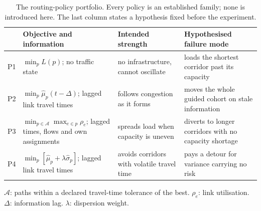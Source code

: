 \begin{table}[tbp]
\caption{The routing-policy portfolio. Every policy is an established family;
none is introduced here. The last column states a hypothesis fixed before the
experiment.}
\label{tab:portfolio}
\centering\footnotesize
\setlength{\tabcolsep}{4pt}
\begin{tabular}{@{}l p{} p{} p{}@{}}
\toprule
& Objective and information & Intended strength & Hypothesised failure mode\\
\midrule
P1 & $\min_p L(p)$; no traffic state &
  no infrastructure, cannot oscillate &
  loads the shortest corridor past its capacity\\[3pt]
P2 & $\min_p \hat\mu_p(t-\Delta)$; lagged link travel times &
  follows congestion as it forms &
  moves the whole guided cohort on stale information\\[3pt]
P3 & $\min_{p\in\mathcal{A}} \max_{e\in p}\rho_e$; lagged times, flows and own
  assignments &
  spreads load when capacity is uneven &
  diverts to longer corridors with no capacity shortage\\[3pt]
P4 & $\min_p [\hat\mu_p + \lambda\hat\sigma_p]$; lagged link travel times &
  avoids corridors with volatile travel time &
  pays a detour for variance carrying no risk\\
\bottomrule
\end{tabular}

\medskip
\footnotesize $\mathcal{A}$: paths within a declared travel-time tolerance of
the best. $\rho_e$: link utilisation. $\Delta$: information lag. $\lambda$:
dispersion weight.
\end{table}